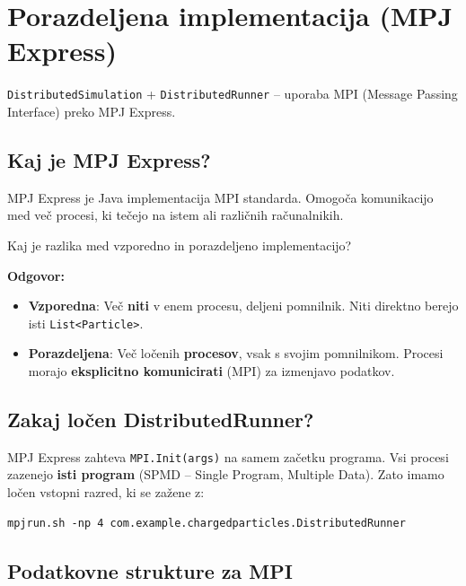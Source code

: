 \documentclass[12pt,a4paper]{article}
\begin{document}
\section{Porazdeljena implementacija (MPJ Express)}

\texttt{DistributedSimulation} + \texttt{DistributedRunner} -- uporaba MPI (Message Passing Interface) preko MPJ Express.

\subsection{Kaj je MPJ Express?}

MPJ Express je Java implementacija MPI standarda. Omogo\v{c}a komunikacijo med ve\v{c} procesi, ki te\v{c}ejo na istem ali razli\v{c}nih ra\v{c}unalnikih.

\begin{vprasanje}
Kaj je razlika med vzporedno in porazdeljeno implementacijo?

\textbf{Odgovor:}
\begin{itemize}
    \item \textbf{Vzporedna}: Ve\v{c} \textbf{niti} v enem procesu, deljeni pomnilnik. Niti direktno berejo isti \texttt{List<Particle>}.
    \item \textbf{Porazdeljena}: Ve\v{c} lo\v{c}enih \textbf{procesov}, vsak s svojim pomnilnikom. Procesi morajo \textbf{eksplicitno komunicirati} (MPI) za izmenjavo podatkov.
\end{itemize}
\end{vprasanje}

\subsection{Zakaj lo\v{c}en DistributedRunner?}

MPJ Express zahteva \texttt{MPI.Init(args)} na samem za\v{c}etku programa. Vsi procesi zazenejo \textbf{isti program} (SPMD -- Single Program, Multiple Data). Zato imamo lo\v{c}en vstopni razred, ki se za\v{z}ene z:
\begin{verbatim}
mpjrun.sh -np 4 com.example.chargedparticles.DistributedRunner
\end{verbatim}

\subsection{Podatkovne strukture za MPI}
\end{document}
